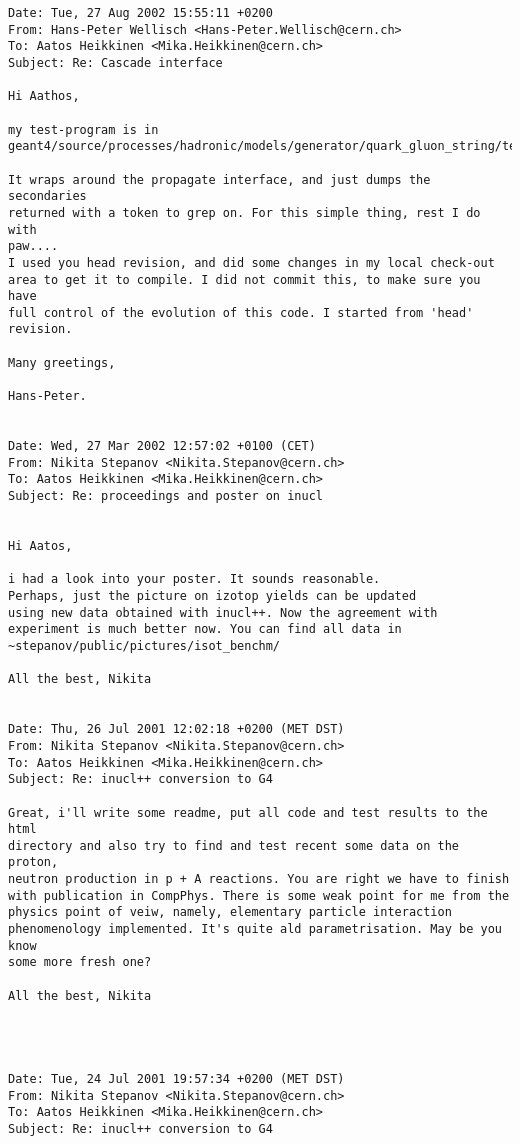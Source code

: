 \begin{verbatim}
Date: Tue, 27 Aug 2002 15:55:11 +0200
From: Hans-Peter Wellisch <Hans-Peter.Wellisch@cern.ch>
To: Aatos Heikkinen <Mika.Heikkinen@cern.ch>
Subject: Re: Cascade interface
 
Hi Aathos,
 
my test-program is in
geant4/source/processes/hadronic/models/generator/quark_gluon_string/test/hammer.cc
 
It wraps around the propagate interface, and just dumps the secondaries
returned with a token to grep on. For this simple thing, rest I do with
paw....
I used you head revision, and did some changes in my local check-out
area to get it to compile. I did not commit this, to make sure you have
full control of the evolution of this code. I started from 'head'
revision.
 
Many greetings,
 
Hans-Peter.


Date: Wed, 27 Mar 2002 12:57:02 +0100 (CET)
From: Nikita Stepanov <Nikita.Stepanov@cern.ch>
To: Aatos Heikkinen <Mika.Heikkinen@cern.ch>
Subject: Re: proceedings and poster on inucl
 
 
Hi Aatos,
 
i had a look into your poster. It sounds reasonable.
Perhaps, just the picture on izotop yields can be updated
using new data obtained with inucl++. Now the agreement with
experiment is much better now. You can find all data in
~stepanov/public/pictures/isot_benchm/
 
All the best, Nikita         


Date: Thu, 26 Jul 2001 12:02:18 +0200 (MET DST)
From: Nikita Stepanov <Nikita.Stepanov@cern.ch>
To: Aatos Heikkinen <Mika.Heikkinen@cern.ch>
Subject: Re: inucl++ conversion to G4
 
Great, i'll write some readme, put all code and test results to the html
directory and also try to find and test recent some data on the proton,
neutron production in p + A reactions. You are right we have to finish
with publication in CompPhys. There is some weak point for me from the
physics point of veiw, namely, elementary particle interaction
phenomenology implemented. It's quite ald parametrisation. May be you know
some more fresh one?
 
All the best, Nikita
                                   



Date: Tue, 24 Jul 2001 19:57:34 +0200 (MET DST)
From: Nikita Stepanov <Nikita.Stepanov@cern.ch>
To: Aatos Heikkinen <Mika.Heikkinen@cern.ch>
Subject: Re: inucl++ conversion to G4
 

\end{verbatim}
